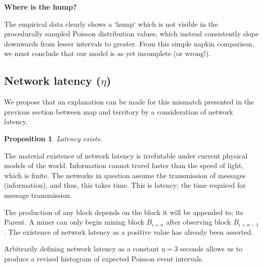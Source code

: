 \documentclass[11pt]{article}
\theoremstyle{plain}
\newtheorem{proposition}{Proposition}[section]
\begin{document}
%

\pagebreak

\textbf{Where is the hump?}

The empirical data clearly shows a `hump` which is not visible in the
procedurally sampled Poisson distribution values,
which instead consistently slope downwards from lesser intervals to greater.
From this simple napkin comparison, we must conclude that our model is as yet
incomplete (or wrong!).

\subsection{\normalsize{Network latency ($\eta$)}}

We propose that an explanation can be made for this mismatch presented in the
previous section between map and territory by a consideration of network
latency.

\vspace{5mm}
\begin{proposition}
  Latency exists.
\end{proposition}

The material existence of network latency is irrefutable under
current physical models of the world.
Information cannot travel faster than the speed of light, which is finite.
The networks in question assume the transmission of messages (information), and
thus, this takes time.
This is latency; the time required for message transmission.

The production of any block depends on the block it will be appended to; its
Parent.
A miner can only begin mining block $B_{i=n}$ after observing block $B_{i=n-1}$.
The existence of network latency as a positive value has already been asserted.

Arbitrarily defining network latency as a constant $\eta=3$ seconds allows us
to produce a revised histogram of expected Poisson event intervals.
\end{document}
